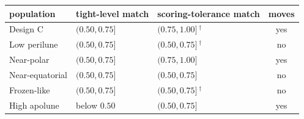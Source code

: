 \begin{tabular}{@{}l l l c@{}}
\toprule
population & tight-level match & scoring-tolerance match & moves \\
\midrule
Design C & $(0.50, 0.75]$ & $(0.75, 1.00]$\,$^{\dagger}$ & yes \\
Low perilune & $(0.50, 0.75]$ & $(0.50, 0.75]$\,$^{\dagger}$ & no \\
Near-polar & $(0.50, 0.75]$ & $(0.75, 1.00]$ & yes \\
Near-equatorial & $(0.50, 0.75]$ & $(0.50, 0.75]$ & no \\
Frozen-like & $(0.50, 0.75]$ & $(0.50, 0.75]$\,$^{\dagger}$ & no \\
High apolune & below $0.50$ & $(0.50, 0.75]$ & yes \\
\bottomrule
\end{tabular}
